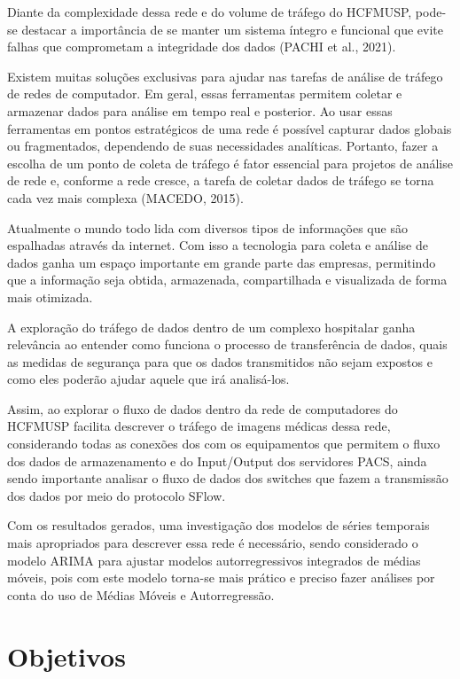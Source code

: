 \documentclass[
	12pt,				%
	openright,			%
	twoside,			%
	a4paper,			%
	english,			%
	french,				%
	spanish,			%
	brazil				%
	]{abntex2}
\begin{document}
Diante da complexidade dessa rede e do volume de tráfego do HCFMUSP, pode-se destacar a importância de se manter um sistema íntegro e funcional que evite falhas que comprometam a integridade dos dados (PACHI et al., 2021).

Existem muitas soluções exclusivas para ajudar nas tarefas de análise de tráfego de redes de computador. Em geral, essas ferramentas permitem coletar e armazenar dados para análise em tempo real e posterior. Ao usar essas ferramentas em pontos estratégicos de uma rede é possível capturar dados globais ou fragmentados, dependendo de suas necessidades analíticas. Portanto, fazer a escolha de um ponto de coleta de tráfego é fator essencial para projetos de análise de rede e, conforme a rede cresce, a tarefa de coletar dados de tráfego se torna cada vez mais complexa (MACEDO, 2015).

Atualmente o mundo todo lida com diversos tipos de informações que são espalhadas através da internet. Com isso a tecnologia para coleta e análise de dados ganha um espaço importante em grande parte das empresas, permitindo que a informação seja obtida, armazenada, compartilhada e visualizada de forma mais otimizada.

A exploração do tráfego de dados dentro de um complexo hospitalar ganha relevância ao entender como funciona o processo de transferência de dados, quais as medidas de segurança para que os dados transmitidos não sejam expostos e como eles poderão ajudar aquele que irá analisá-los.

Assim, ao explorar o fluxo de dados dentro da rede de computadores do HCFMUSP facilita descrever o tráfego de imagens médicas dessa rede, considerando todas as conexões dos com os equipamentos que permitem o fluxo dos dados de armazenamento e do Input/Output dos servidores PACS, ainda sendo importante analisar o fluxo de dados dos switches que fazem a transmissão dos dados por meio do protocolo SFlow.

Com os resultados gerados, uma investigação dos modelos de séries temporais mais apropriados para descrever essa rede é necessário, sendo considerado o modelo ARIMA para ajustar modelos autorregressivos integrados de médias móveis, pois com este modelo torna-se mais prático e preciso fazer análises por conta do uso de Médias Móveis e Autorregressão.

\section{Objetivos}
\end{document}
